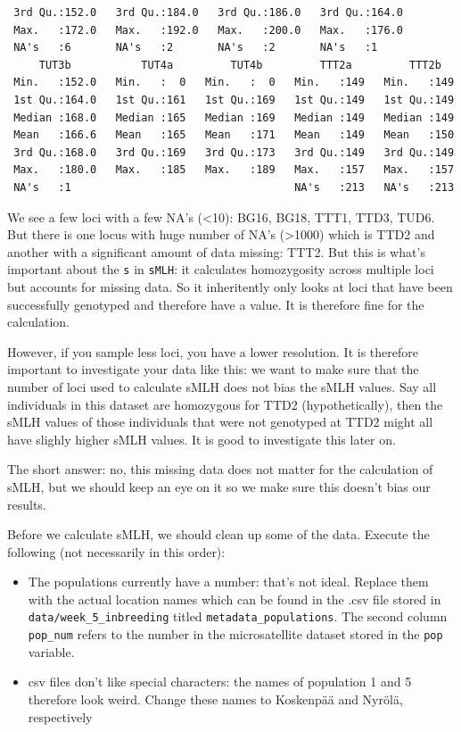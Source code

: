 \documentclass[
  letterpaper,
  DIV=11,
  numbers=noendperiod]{scrreprt}
\providecommand{\tightlist}{%
  \setlength{\itemsep}{0pt}\setlength{\parskip}{0pt}}\usepackage{longtable,booktabs,array}
\begin{document}
\begin{tcolorbox}
\begin{verbatim}
 3rd Qu.:152.0   3rd Qu.:184.0   3rd Qu.:186.0   3rd Qu.:164.0  
 Max.   :172.0   Max.   :192.0   Max.   :200.0   Max.   :176.0  
 NA's   :6       NA's   :2       NA's   :2       NA's   :1      
     TUT3b           TUT4a         TUT4b         TTT2a         TTT2b    
 Min.   :152.0   Min.   :  0   Min.   :  0   Min.   :149   Min.   :149  
 1st Qu.:164.0   1st Qu.:161   1st Qu.:169   1st Qu.:149   1st Qu.:149  
 Median :168.0   Median :165   Median :169   Median :149   Median :149  
 Mean   :166.6   Mean   :165   Mean   :171   Mean   :149   Mean   :150  
 3rd Qu.:168.0   3rd Qu.:169   3rd Qu.:173   3rd Qu.:149   3rd Qu.:149  
 Max.   :180.0   Max.   :185   Max.   :189   Max.   :157   Max.   :157  
 NA's   :1                                   NA's   :213   NA's   :213  
\end{verbatim}

We see a few loci with a few NA's (\textless10): BG16, BG18, TTT1, TTD3,
TUD6. But there is one locus with huge number of NA's (\textgreater1000)
which is TTD2 and another with a significant amount of data missing:
TTT2. But this is what's important about the \texttt{s} in
\texttt{sMLH}: it calculates homozygosity across multiple loci but
accounts for missing data. So it inheritently only looks at loci that
have been successfully genotyped and therefore have a value. It is
therefore fine for the calculation.

However, if you sample less loci, you have a lower resolution. It is
therefore important to investigate your data like this: we want to make
sure that the number of loci used to calculate sMLH does not bias the
sMLH values. Say all individuals in this dataset are homozygous for TTD2
(hypothetically), then the sMLH values of those individuals that were
not genotyped at TTD2 might all have slighly higher sMLH values. It is
good to investigate this later on.

The short answer: no, this missing data does not matter for the
calculation of sMLH, but we should keep an eye on it so we make sure
this doesn't bias our results.

\end{tcolorbox}

Before we calculate sMLH, we should clean up some of the data. Execute
the following (not necessarily in this order):

\begin{itemize}
\tightlist
\item
  The populations currently have a number: that's not ideal. Replace
  them with the actual location names which can be found in the .csv
  file stored in \texttt{data/week\_5\_inbreeding} titled
  \texttt{metadata\_populations}. The second column \texttt{pop\_num}
  refers to the number in the microsatellite dataset stored in the
  \texttt{pop} variable.
\item
  csv files don't like special characters: the names of population 1 and
  5 therefore look weird. Change these names to Koskenpää and Nyrölä,
  respectively
\end{itemize}
\end{document}
